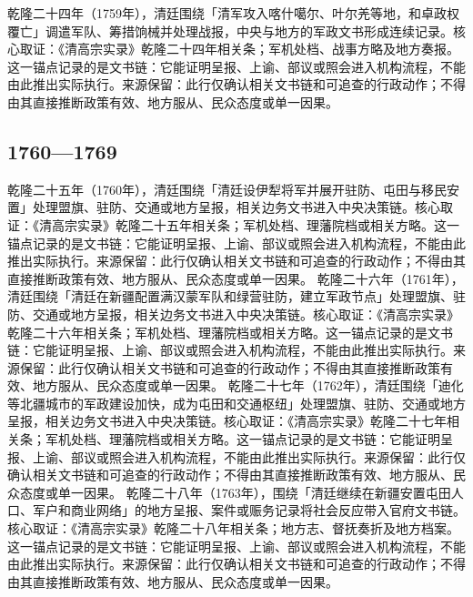 乾隆二十四年（1759年），清廷围绕「清军攻入喀什噶尔、叶尔羌等地，和卓政权覆亡」调遣军队、筹措饷械并处理战报，中央与地方的军政文书形成连续记录。核心取证：《清高宗实录》乾隆二十四年相关条；军机处档、战事方略及地方奏报。这一锚点记录的是文书链：它能证明呈报、上谕、部议或照会进入机构流程，不能由此推出实际执行。来源保留：此行仅确认相关文书链和可追查的行政动作；不得由其直接推断政策有效、地方服从、民众态度或单一因果。
\subsection{1760—1769}
乾隆二十五年（1760年），清廷围绕「清廷设伊犁将军并展开驻防、屯田与移民安置」处理盟旗、驻防、交通或地方呈报，相关边务文书进入中央决策链。核心取证：《清高宗实录》乾隆二十五年相关条；军机处档、理藩院档或相关方略。这一锚点记录的是文书链：它能证明呈报、上谕、部议或照会进入机构流程，不能由此推出实际执行。来源保留：此行仅确认相关文书链和可追查的行政动作；不得由其直接推断政策有效、地方服从、民众态度或单一因果。
乾隆二十六年（1761年），清廷围绕「清廷在新疆配置满汉蒙军队和绿营驻防，建立军政节点」处理盟旗、驻防、交通或地方呈报，相关边务文书进入中央决策链。核心取证：《清高宗实录》乾隆二十六年相关条；军机处档、理藩院档或相关方略。这一锚点记录的是文书链：它能证明呈报、上谕、部议或照会进入机构流程，不能由此推出实际执行。来源保留：此行仅确认相关文书链和可追查的行政动作；不得由其直接推断政策有效、地方服从、民众态度或单一因果。
乾隆二十七年（1762年），清廷围绕「迪化等北疆城市的军政建设加快，成为屯田和交通枢纽」处理盟旗、驻防、交通或地方呈报，相关边务文书进入中央决策链。核心取证：《清高宗实录》乾隆二十七年相关条；军机处档、理藩院档或相关方略。这一锚点记录的是文书链：它能证明呈报、上谕、部议或照会进入机构流程，不能由此推出实际执行。来源保留：此行仅确认相关文书链和可追查的行政动作；不得由其直接推断政策有效、地方服从、民众态度或单一因果。
乾隆二十八年（1763年），围绕「清廷继续在新疆安置屯田人口、军户和商业网络」的地方呈报、案件或赈务记录将社会反应带入官府文书链。核心取证：《清高宗实录》乾隆二十八年相关条；地方志、督抚奏折及地方档案。这一锚点记录的是文书链：它能证明呈报、上谕、部议或照会进入机构流程，不能由此推出实际执行。来源保留：此行仅确认相关文书链和可追查的行政动作；不得由其直接推断政策有效、地方服从、民众态度或单一因果。
